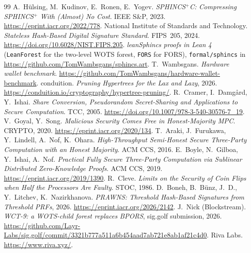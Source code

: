 \documentclass[11pt]{article}
\begin{document}
\raggedright
\begin{thebibliography}{99}
 A.~H\"ulsing, M.~Kudinov, E.~Ronen, E.~Yogev. \emph{SPHINCS$^+$C: Compressing SPHINCS$^+$
  With (Almost) No Cost}. IEEE S\&P, 2023. \url{https://eprint.iacr.org/2022/778}.
 National Institute of Standards and Technology. \emph{Stateless Hash-Based Digital Signature
  Standard}. FIPS~205, 2024. \url{https://doi.org/10.6028/NIST.FIPS.205}.
 \emph{leanSphincs proofs in Lean 4} (\texttt{LeanForest} for the two-level WOTS forest,
  \texttt{FORS} for FORS), \texttt{formal/sphincs} in
  \url{https://github.com/TomWambsgans/sphincs.art}.
 T.~Wambsgans. \emph{Hardware wallet benchmark}.
  \url{https://github.com/TomWambsgans/hardware-wallet-benchmark}.
 conduition. \emph{Pruning Hypertrees for the Lax and Lazy}, 2026.
  \url{https://conduition.io/cryptography/hypertree-pruning/}.
 R.~Cramer, I.~Damg{\aa}rd, Y.~Ishai. \emph{Share Conversion, Pseudorandom Secret-Sharing and
  Applications to Secure Computation}. TCC, 2005. \url{https://doi.org/10.1007/978-3-540-30576-7_19}.
 V.~Goyal, Y.~Song. \emph{Malicious Security Comes Free in Honest-Majority MPC}. CRYPTO, 2020.
  \url{https://eprint.iacr.org/2020/134}.
 T.~Araki, J.~Furukawa, Y.~Lindell, A.~Nof, K.~Ohara. \emph{High-Throughput Semi-Honest Secure
  Three-Party Computation with an Honest Majority}. ACM CCS, 2016.
 E.~Boyle, N.~Gilboa, Y.~Ishai, A.~Nof. \emph{Practical Fully Secure Three-Party
  Computation via Sublinear Distributed Zero-Knowledge Proofs}. ACM CCS, 2019.
  \url{https://eprint.iacr.org/2019/1390}.
 R.~Cleve. \emph{Limits on the Security of Coin Flips when Half the Processors Are Faulty}. STOC, 1986.
 D.~Boneh, B.~B\"unz, J.~D., Y.~Litchev, K.~Nazirkhanova. \emph{PRAWNS: Threshold Hash-Based
  Signatures from Threshold PRFs}, 2026. \url{https://eprint.iacr.org/2026/2142}.
 J.~Nick (Blockstream). \emph{WCT-9: a WOTS-child forest replaces BPORS}, sig.golf
  submission, 2026. \url{https://github.com/Layr-Labs/sig.golf/commit/3321b777a511a6b454aad7ab721e8ab1af21c4d0}.
 Riva Labs. \url{https://www.riva.xyz/}.
\end{thebibliography}
\end{document}
